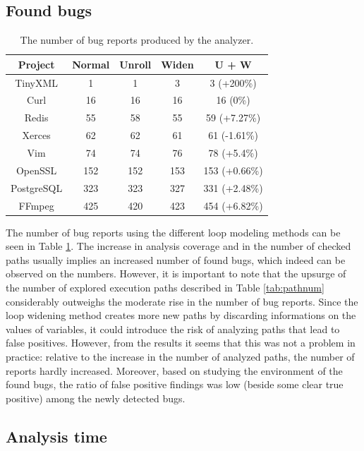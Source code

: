 \documentclass[oneside, a4paper, 12pt]{article}
\theoremstyle{definition}
\begin{document}
\subsection{Found bugs}
\begin{table}[!htb]
	\centering
\begin{tabular}{ |c||c|c|c|c| } 
	\hline
	Project & Normal & Unroll & Widen & U + W \\
	\hline \hline
	TinyXML & 1 & 1 & 3 & 3 (+200\%) \\
	\hline
	Curl & 16 & 16 & 16 & 16 (0\%) \\ 
	\hline
	Redis & 55 & 58 & 55 & 59 (+7.27\%) \\ 
	\hline
	Xerces & 62 & 62 & 61 & 61 (-1.61\%) \\ 
	\hline
	Vim & 74 & 74 & 76 & 78 (+5.4\%) \\
	\hline
	OpenSSL & 152 & 152 & 153 & 153 (+0.66\%) \\ 
	\hline
	PostgreSQL & 323 & 323 & 327 & 331 (+2.48\%) \\ 
	\hline
	FFmpeg & 425 & 420 & 423 & 454 (+6.82\%) \\ 		
	\hline
\end{tabular}
\caption{The number of bug reports produced by the analyzer.} \label{tab:reportnum}
\end{table}
The number of bug reports using the different loop modeling methods can be seen
in Table \ref{tab:reportnum}. The increase in analysis coverage and in the number of 
checked paths usually implies an increased number of found bugs, which indeed can be 
observed on the numbers. However, it is important to note that the upsurge of the number 
of explored execution paths described in Table \ref{tab:pathnum} considerably outweighs 
the moderate rise in the number of bug reports.
Since the loop widening method creates more new paths by discarding informations on the values of variables, it could introduce the risk of analyzing paths that lead to false positives.
However, from the results it seems that this was not a problem in practice: relative to the increase in the number of analyzed paths, the number of reports hardly increased. Moreover, based on studying the environment of the found bugs, the ratio of false positive findings was low (beside some clear true positive) among the newly detected bugs.

\subsection{Analysis time}
\end{document}
